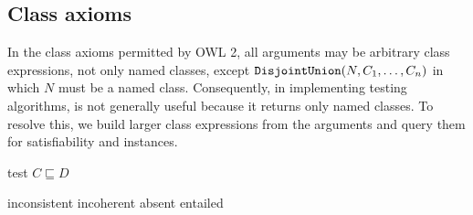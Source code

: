 \documentclass[paper.tex]{subfiles}
\begin{document}
\subsection{Class axioms}
\label{sec:algorithms:class}

In the class axioms permitted by OWL 2, all arguments may be arbitrary class expressions, not only named classes, except $\mathtt{DisjointUnion}(N, C_1, \ldots, C_n)$ in which $N$ must be a named class.  Consequently, in implementing testing algorithms,  is not generally useful because it returns only named classes.  To resolve this, we build larger class expressions from the arguments and query them for satisfiability and instances.

\begin{algorithm}[H]
  \caption{test $C \sqsubseteq D$}
  \begin{algorithmic}[1]
    \raggedright
        \State \Return inconsistent
        \label{alg:testSubClassOf:returnInconsistent}
        \State \Return incoherent
        \label{alg:testSubClassOf:returnIncoherent}
        \State \Return absent
      \Else
        \State \Return entailed
        \label{alg:testSubClassOf:returnEntailed}
      \EndIf
    \EndFunction
  \end{algorithmic}
\end{algorithm}
\end{document}
